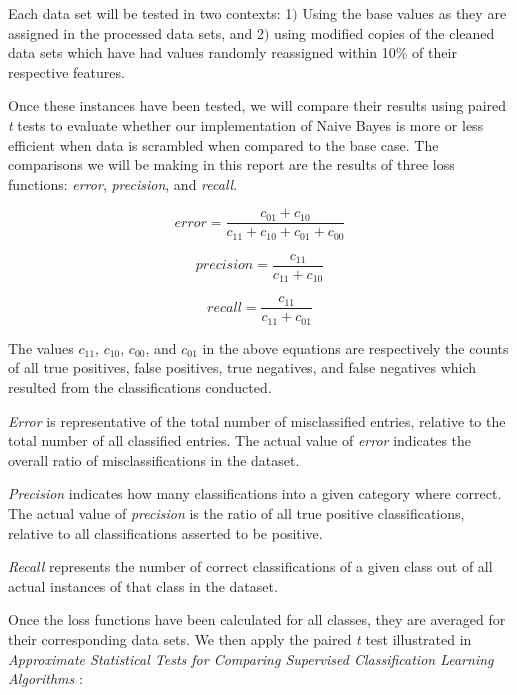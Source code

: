 \documentclass[twoside,11pt]{article}
\begin{document}
	Each data set will be tested in two contexts: 1$)$ Using the base values as they are assigned in the processed data sets, and 2$)$ using modified copies of the cleaned data sets which have had values randomly reassigned within 10\% of their respective features.
		
	Once these instances have been tested, we will compare their results using paired \textit{t} tests to evaluate whether our implementation of Naive Bayes is more or less efficient when data is scrambled when compared to the base case. The comparisons we will be making in this report are the results of three loss functions: \textit{error}, \textit{precision}, and \textit{recall}.
	
	\begin{equation}
		error = \frac{c_{01} + c_{10}}{c_{11} + c_{10} + c_{01} + c_{00}}
	\end{equation}
	
	\begin{equation}
	precision = \frac{c_{11}}{c_{11} + c_{10}}
	\end{equation}
	
	\begin{equation}
	recall = \frac{c_{11}}{c_{11} + c_{01}}
	\end{equation}
	
	The values $c_{11}$, $c_{10}$, $c_{00}$, and $c_{01}$ in the above equations are respectively the counts of all true positives, false positives, true negatives, and false negatives which resulted from the classifications conducted.
	
	\textit{Error} is representative of the total number of misclassified entries, relative to the total number of all classified entries. The actual value of \textit{error} indicates the overall ratio of misclassifications in the dataset.
	
	\textit{Precision} indicates how many classifications into a given category where correct. The actual value of \textit{precision} is the ratio of all true positive classifications, relative to all classifications asserted to be positive.
	
	\textit{Recall} represents the number of correct classifications of a given class out of all actual instances of that class in the dataset.
		
	Once the loss functions have been calculated for all classes, they are averaged for their corresponding data sets. We then apply the paired \textit{t} test illustrated in \textit{Approximate Statistical Tests for Comparing Supervised Classification Learning Algorithms} \citep{Dietterich1997}:
	
\end{document}
